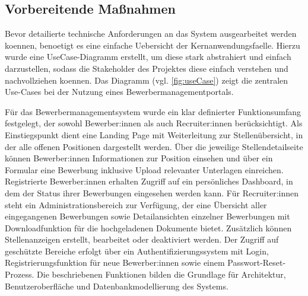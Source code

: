 \subsection{Vorbereitende Maßnahmen}
Bevor detailierte technische Anforderungen an das System ausgearbeitet werden koennen, benoetigt es eine einfache Uebersicht der Kernanwendungsfaelle.
Hierzu wurde eine UseCase-Diagramm erstellt, um diese stark abstrahiert und einfach darzustellen, sodass die Stakeholder des Projektes diese einfach verstehen und nachvollziehen koennen.
Das Diagramm (vgl. \ref{fig:useCase}) zeigt die zentralen Use-Cases bei der Nutzung eines Bewerbermanagementportals.

Für das Bewerbermanagementsystem wurde ein klar definierter Funktionsumfang festgelegt, der sowohl Bewerber:innen als auch Recruiter:innen berücksichtigt. 
Als Einstiegspunkt dient eine Landing Page mit Weiterleitung zur Stellenübersicht, in der alle offenen Positionen dargestellt werden. 
Über die jeweilige Stellendetailseite können Bewerber:innen Informationen zur Position einsehen und über ein Formular eine Bewerbung inklusive Upload relevanter Unterlagen einreichen.
Registrierte Bewerber:innen erhalten Zugriff auf ein persönliches Dashboard, in dem der Status ihrer Bewerbungen eingesehen werden kann. 
Für Recruiter:innen steht ein Administrationsbereich zur Verfügung, der eine Übersicht aller eingegangenen Bewerbungen sowie Detailansichten einzelner Bewerbungen mit Downloadfunktion für die hochgeladenen Dokumente bietet. 
Zusätzlich können Stellenanzeigen erstellt, bearbeitet oder deaktiviert werden.
Der Zugriff auf geschützte Bereiche erfolgt über ein Authentifizierungssystem mit Login, Registrierungsfunktion für neue Bewerber:innen sowie einem Passwort-Reset-Prozess. 
Die beschriebenen Funktionen bilden die Grundlage für Architektur, Benutzeroberfläche und Datenbankmodellierung des Systems.

